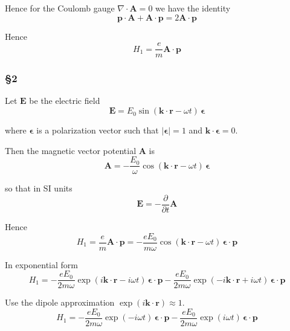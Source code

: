 Hence for the Coulomb gauge $\nabla\cdot\mathbf A=0$ we have the identity
\begin{equation*}
\mathbf p\cdot\mathbf A+\mathbf A\cdot\mathbf p=2\mathbf A\cdot\mathbf p
\end{equation*}

Hence
\begin{equation*}
H_1=\frac{e}{m}\mathbf A\cdot\mathbf p
\end{equation*}

\subsubsection*{\S2}

Let $\mathbf E$ be the electric field
\begin{equation*}
\mathbf E=E_0\sin(\mathbf k\cdot\mathbf r-\omega t)\,\boldsymbol\epsilon
\end{equation*}

where $\boldsymbol\epsilon$ is a polarization vector such that $|\boldsymbol\epsilon|=1$
and $\mathbf k\cdot\boldsymbol\epsilon=0$.

\bigskip
Then the magnetic vector potential $\mathbf A$ is
\begin{equation*}
\mathbf A=-\frac{E_0}{\omega}\cos(\mathbf k\cdot\mathbf r-\omega t)\,\boldsymbol{\epsilon}
\end{equation*}

so that in SI units
\begin{equation*}
\mathbf E=-\frac{\partial}{\partial t}\mathbf A
\tag{2}
\end{equation*}

Hence
\begin{equation*}
H_1=\frac{e}{m}\mathbf A\cdot\mathbf p=-\frac{eE_0}{m\omega}
\cos(\mathbf k\cdot\mathbf r-\omega t)
\,\boldsymbol{\epsilon}\cdot\mathbf p
\end{equation*}

In exponential form
\begin{equation*}
H_1=
-\frac{eE_0}{2m\omega}\exp(i\mathbf k\cdot\mathbf r-i\omega t)
\,\boldsymbol{\epsilon}\cdot\mathbf p
-\frac{eE_0}{2m\omega}\exp(-i\mathbf k\cdot\mathbf r+i\omega t)
\,\boldsymbol{\epsilon}\cdot\mathbf p
\end{equation*}

Use the dipole approximation $\exp(i\mathbf k\cdot\mathbf r)\approx1$.
\begin{equation*}
H_1=
-\frac{eE_0}{2m\omega}\exp(-i\omega t)
\,\boldsymbol{\epsilon}\cdot\mathbf p
-\frac{eE_0}{2m\omega}\exp(i\omega t)
\,\boldsymbol{\epsilon}\cdot\mathbf p
\end{equation*}


